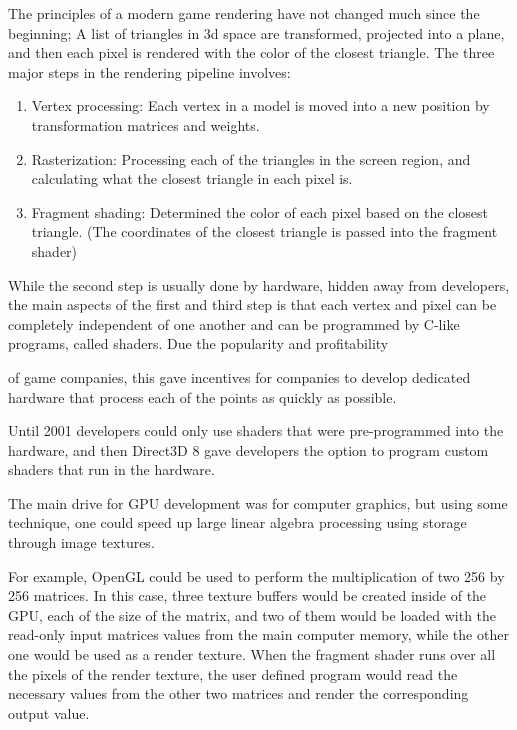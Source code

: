 \documentclass[12pt]{report}
\begin{document}
The principles of a modern game rendering have not changed much since the beginning; A list of triangles in 3d space are transformed, projected into a plane, and then each pixel is rendered with the color of the closest triangle. The three major steps in the rendering pipeline involves:

\begin{enumerate}
\item Vertex processing: Each vertex in a model is moved into a new position by transformation matrices and weights.
\item Rasterization: Processing each of the triangles in the screen region, and calculating what the closest triangle in each pixel is.
\item Fragment shading: Determined the color of each pixel based on the closest triangle. (The coordinates of the closest triangle is passed into the fragment shader)
\end{enumerate}

While the second step is usually done by hardware, hidden away from developers, the main aspects of the first and third step is that each vertex and pixel can be completely independent of one another and can be programmed by C-like programs, called shaders. Due the popularity and profitability

of game companies, this gave incentives for companies to develop dedicated hardware that process each of the points as quickly as possible.

Until 2001 developers could only use shaders that were pre-programmed into the hardware, and then Direct3D 8 \cite{wiki:direct3d} gave developers the option to program custom shaders that run in the hardware.

The main drive for GPU development was for computer graphics, but using some technique, one could speed up large linear algebra processing using storage through image textures. \cite{Goeddeke:2005:GBM}

For example, OpenGL could be used to perform the multiplication of two 256 by 256 matrices. In this case, three texture buffers would be created inside of the GPU, each of the size of the matrix, and two of them would be loaded with the read-only input matrices values from the main computer memory, while the other one would be used as a render texture. When the fragment shader runs over all the pixels of the render texture, the user defined program would read the necessary values from the other two matrices and render the corresponding output value. 
\end{document}

